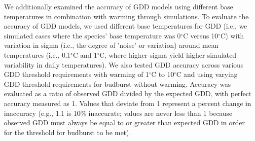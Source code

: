 \documentclass{article}\usepackage[]{graphicx}\usepackage[]{color}
\begin{document}
We additionally examined the accuracy of GDD models using different base temperatures in combination with warming through simulations. To evaluate the accuracy of GDD models, we used different base temperatures for GDD (i.e., we simulated cases where the species' base temperature was 0$^{\circ}$C versus 10$^{\circ}$C) with variation in sigma (i.e., the degree of 'noise' or variation) around mean temperatures (i.e., 0.1$^{\circ}$C and 1$^{\circ}$C, where higher sigma yield higher simulated variability in daily temperatures). We also tested GDD accuracy across various GDD threshold requirements with warming of 1$^{\circ}$C to 10$^{\circ}$C and using varying GDD threshold requirements for budburst without warming. Accuracy was evaluated as a ratio of observed GDD divided by the expected GDD, with perfect accuracy measured as 1. Values that deviate from 1 represent a percent change in inaccuracy (e.g., 1.1 is 10\% inaccurate; values are never less than 1 because observed GDD must always be equal to or greater than expected GDD in order for the threshold for budburst to be met).
\end{document}
